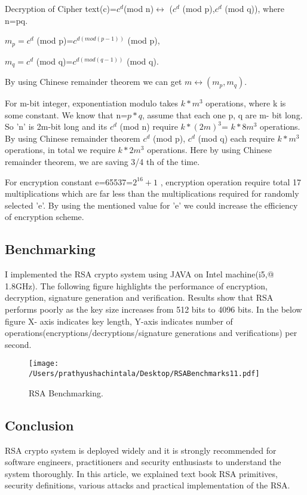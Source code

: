 \documentclass{article}
\begin{document}
 Decryption of Cipher text(c)=$c^{d} $(mod n)$\leftrightarrow$ ($c^{d}$ (mod p),$c^{d}$ (mod q)), where n=pq.
 
         $m_{p}=c^{d}$ (mod p)=$c^{d(mod (p-1))}$ (mod p),
         
         $m_{q}=c^{d}$ (mod q)=$c^{d(mod (q-1))}$ (mod q).
         
         By using Chinese remainder theorem we can get $m\leftrightarrow (m_{p},m_{q})$. 
              
For m-bit integer, exponentiation modulo takes $k*m^{3}$ operations, where k is some constant. We know that n=$p*q$, assume that each one p, q are m- bit long. So 'n' is 2m-bit long and its  $c^{d}$ (mod n) require  $k*(2m)^{3}$= $k*8m^{3}$ operations.  By using Chinese remainder theorem $c^{d}$ (mod p), $c^{d}$ (mod q) each require $k*m^{3}$ operations, in total we require $k*2m^{3}$ operations. Here by using Chinese remainder theorem, we are saving 3/4 th of the time.

For encryption constant e=65537=$2^{16}+1$ , encryption operation require total 17 multiplications which are far less than the multiplications required for randomly selected 'e'. By using the mentioned value for 'e' we could increase the efficiency of encryption scheme.
 \subsection{Benchmarking}
 I implemented the RSA crypto system using JAVA on Intel machine(i5,@ 1.8GHz). The following figure highlights the performance of encryption, decryption, signature generation and verification. Results show that RSA performs poorly as the key size increases from 512 bits to 4096 bits. In the below figure X- axis indicates key length, Y-axis indicates number of operations(encryptions/decryptions/signature generations and verifications) per second.
  
 
 \begin{figure}[!htb]
	\texttt{[image: /Users/prathyushachintala/Desktop/RSABenchmarks11.pdf]}
	\caption{RSA Benchmarking.}
	\label{fig:RSA Benchmarking}
\end{figure}



 \subsection{Conclusion}
  
 RSA crypto system is deployed widely and it is strongly recommended for software engineers, practitioners and security enthusiasts to understand the system thoroughly. In this article, we explained text book RSA primitives, security definitions, various attacks and practical implementation of the RSA. 
 
\end{document}
